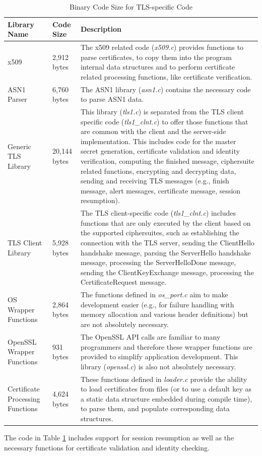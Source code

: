 \documentclass[a4paper, 10pt]{IEEEtran}
\begin{document}
\begin{table}[htdp]
\caption{Binary Code Size for TLS-specific Code}
\begin{center}
\begin{tabular}{|p{1cm}|p{}|p{}|}
\hline
\textbf{Library Name} & \textbf{Code Size} & \textbf{Description} \\
\hline\hline
x509& 2,912 bytes & The x509 related code (\textit{x509.c}) provides functions to parse certificates, to copy them into the program internal data structures and to perform certificate related processing functions, like certificate verification.\\ 
\hline\hline
ASN1 Parser & 6,760 bytes & The ASN1 library (\textit{asn1.c}) contains the necessary code to parse ASN1 data.\\ 
\hline\hline
Generic TLS Library & 20,144 bytes & This library (\textit{tls1.c}) is separated from the TLS client specific code (\textit{tls1\_clnt.c}) to offer those functions that are common with the client and the server-side implementation. This includes code for the master secret generation, certificate validation and identity verification, computing the finished message, ciphersuite related functions, encrypting and decrypting data, sending and receiving TLS messages (e.g., finish message, alert messages, certificate message, session resumption).\\ 
\hline\hline
TLS Client Library & 5,928 bytes & The TLS client-specific code (\textit{tls1\_clnt.c}) includes functions that are only executed by the client based on the supported ciphersuites, such as establishing the connection with the TLS server, sending the ClientHello handshake message, parsing the ServerHello handshake message, processing the ServerHelloDone message, sending the ClientKeyExchange message, processing the CertificateRequest message. \\ 
\hline\hline
OS Wrapper Functions & 2,864 bytes & The functions defined in \textit{os\_port.c} aim to make development easier (e.g., for failure handling with memory allocation and various header definitions) but are not absolutely necessary.\\ 
\hline\hline
OpenSSL Wrapper Functions & 931 bytes & The OpenSSL API calls are familiar to many programmers and therefore these wrapper functions are provided to simplify application development. This library (\textit{openssl.c}) is also not absolutely necessary.\\ 
\hline\hline
Certificate Processing Functions & 4,624 bytes & These functions defined in \textit{loader.c} provide the ability to load certificates from files (or to use a default key as a static data structure embedded during compile time), to parse them, and populate corresponding data structures. \\
\hline
\end{tabular}
\end{center}
\label{tls-code-table}
\end{table}
The code in Table \ref{tls-code-table} includes support for session resumption as well as the necessary functions for certificate validation and identity checking. 
\end{document}
